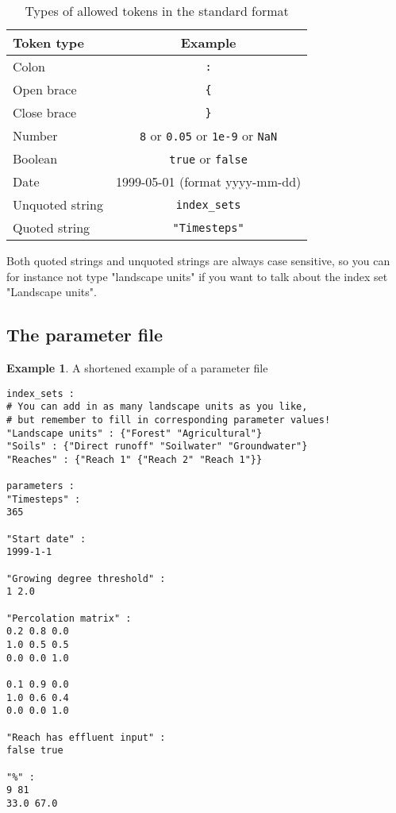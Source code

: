 \documentclass[11pt]{article}
\theoremstyle{definition}
\newtheorem{myexample}{Example}
\newenvironment{example}%
  {\begin{lrbox}{\examplebox}%
   \begin{minipage}{\dimexpr\linewidth-2\fboxsep}
   \begin{myexample}}%
  {\end{myexample}%
   \end{minipage}%
   \end{lrbox}%
   \begin{trivlist}
     \item[]\colorbox{silver}{\usebox\examplebox}
   \end{trivlist}}
\begin{document}
\begin{table}[H]
\centering
\label{tab:tokens}
\begin{tabular}{|l|c|}
\hline
{\bf Token type} & {\bf Example} \\
\hline
Colon & {\tt :}  \\
\hline
Open brace & {\tt \{} \\
\hline
Close brace & {\tt \}} \\
\hline
Number & {\tt 8} or {\tt 0.05} or {\tt 1e-9} or {\tt NaN} \\
\hline
Boolean &{\tt  true} or {\tt false} \\
\hline
Date & 1999-05-01 (format yyyy-mm-dd) \\
\hline
Unquoted string & {\tt index\_sets} \\
\hline
Quoted string & {\tt "Timesteps"} \\
\hline
\end{tabular}
\caption{Types of allowed tokens in the standard format}
\end{table}

Both quoted strings and unquoted strings are always case sensitive, so you can for instance not type "landscape units" if you want to talk about the index set "Landscape units".

\subsection{The parameter file}

\begin{example}\label{ex:parameterfile}
A shortened example of a parameter file
\begin{lstlisting}
index_sets :
# You can add in as many landscape units as you like,
# but remember to fill in corresponding parameter values!
"Landscape units" : {"Forest" "Agricultural"}
"Soils" : {"Direct runoff" "Soilwater" "Groundwater"}
"Reaches" : {"Reach 1" {"Reach 2" "Reach 1"}}

parameters :
"Timesteps" :
365

"Start date" :
1999-1-1

"Growing degree threshold" :
1 2.0

"Percolation matrix" :
0.2 0.8 0.0
1.0 0.5 0.5
0.0 0.0 1.0

0.1 0.9 0.0
1.0 0.6 0.4
0.0 0.0 1.0

"Reach has effluent input" :
false true

"%" :
9 81
33.0 67.0
\end{lstlisting}
\end{example}
\end{document}
